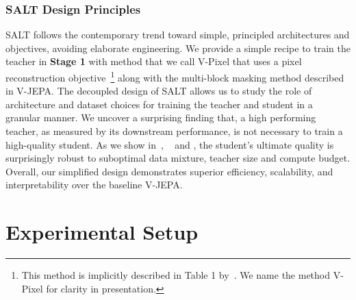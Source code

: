 \documentclass{applemlr}
\numberwithin{equation}{section}
\newcommand{\ourmethod}{SALT\xspace}
\begin{document}
\subsubsection{\ourmethod Design Principles}
SALT follows the contemporary trend toward simple, principled architectures and objectives, avoiding elaborate engineering.  
We provide a simple recipe to train the teacher in \textbf{Stage 1} with method that we call V-Pixel that uses a pixel reconstruction objective~\footnote{This method is implicitly described in Table 1 by~\citet{bardes2024vjepa}. We name the method V-Pixel for clarity in presentation.} along with the multi-block masking method described in V-JEPA. 
The decoupled design of \ourmethod allows us to study the role of architecture and dataset choices for training the teacher and student in a granular manner.  We uncover a surprising finding that, a high performing teacher, as measured by its downstream performance, is not necessary to train a high-quality student. As we show in~, ~ and , the student's ultimate quality is surprisingly robust to suboptimal data mixture, teacher size and compute budget. 
Overall, our simplified design demonstrates superior efficiency, scalability, and interpretability over the baseline V-JEPA. 

\section{Experimental Setup}
\label{sec:expt_setup}
\end{document}
